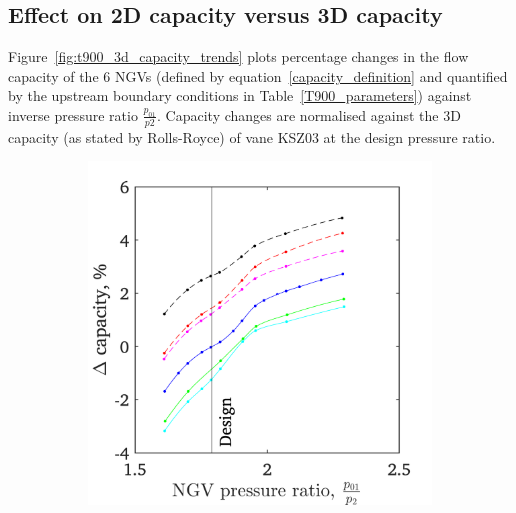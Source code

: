 \documentclass[a4paper, 11pt, oneside]{report}
\begin{document}
\subsection{Effect on 2D capacity versus 3D capacity}

Figure~\ref{fig:t900_3d_capacity_trends} plots percentage changes in the flow capacity of the 6 NGVs (defined by equation~\ref{capacity_definition} and quantified by the upstream boundary conditions in Table~\ref{T900_parameters}) against inverse pressure ratio $\frac{p_{01}}{p2}$. Capacity changes are normalised against the 3D capacity (as stated by Rolls-Royce) of vane KSZ03 at the design pressure ratio.

\begin{figure}[H]
	\centering
	\begin{subfigure}{.45\textwidth}
		\centering
		\includegraphics[width=\linewidth]{figs/t900_3d_capacity_trends.png}
	\end{subfigure}
	\begin{subfigure}{.1125\textwidth}
		\centering

\end{subfigure}
\end{figure}
\end{document}
